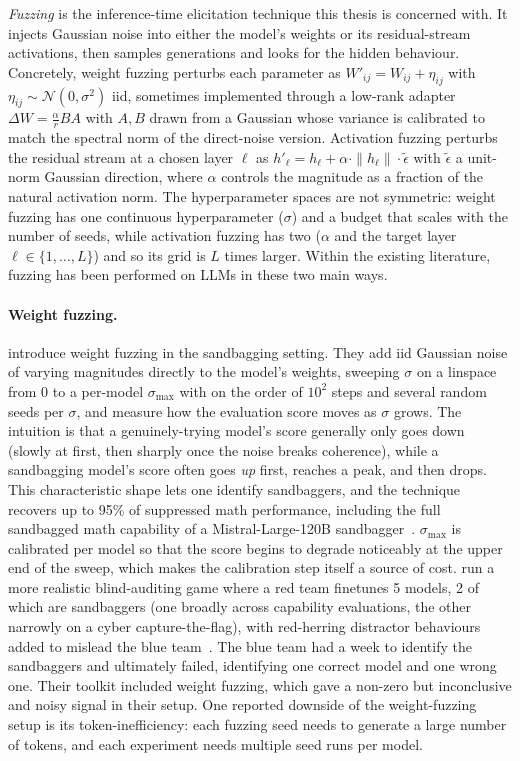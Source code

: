 \documentclass{article}
\begin{document}
\emph{Fuzzing} is the inference-time elicitation technique this thesis is concerned with. It injects Gaussian noise into either the model's weights or its residual-stream activations, then samples generations and looks for the hidden behaviour. Concretely, weight fuzzing perturbs each parameter as $W'_{ij} = W_{ij} + \eta_{ij}$ with $\eta_{ij} \sim \mathcal{N}(0, \sigma^2)$ iid, sometimes implemented through a low-rank adapter~\citep{hu2022lora} $\Delta W = \frac{\alpha}{r} B A$ with $A, B$ drawn from a Gaussian whose variance is calibrated to match the spectral norm of the direct-noise version. Activation fuzzing perturbs the residual stream at a chosen layer $\ell$ as $h'_\ell = h_\ell + \alpha \cdot \|h_\ell\| \cdot \tilde{\epsilon}$ with $\tilde{\epsilon}$ a unit-norm Gaussian direction, where $\alpha$ controls the magnitude as a fraction of the natural activation norm. The hyperparameter spaces are not symmetric: weight fuzzing has one continuous hyperparameter ($\sigma$) and a budget that scales with the number of seeds, while activation fuzzing has two ($\alpha$ and the target layer $\ell \in \{1, \ldots, L\}$) and so its grid is $L$ times larger. Within the existing literature, fuzzing has been performed on LLMs in these two main ways.


\paragraph{Weight fuzzing.} \citet{tice2024} introduce weight fuzzing in the sandbagging setting. They add iid Gaussian noise of varying magnitudes directly to the model's weights, sweeping $\sigma$ on a linspace from $0$ to a per-model $\sigma_{\max}$ with on the order of $10^2$ steps and several random seeds per $\sigma$, and measure how the evaluation score moves as $\sigma$ grows. The intuition is that a genuinely-trying model's score generally only goes down (slowly at first, then sharply once the noise breaks coherence), while a sandbagging model's score often goes \emph{up} first, reaches a peak, and then drops. This characteristic shape lets one identify sandbaggers, and the technique recovers up to 95\% of suppressed math performance, including the full sandbagged math capability of a Mistral-Large-120B sandbagger~\citep{tice2024}. $\sigma_{\max}$ is calibrated per model so that the score begins to degrade noticeably at the upper end of the sweep, which makes the calibration step itself a source of cost. \citet{ukaisi2025} run a more realistic blind-auditing game where a red team finetunes 5 models, 2 of which are sandbaggers (one broadly across capability evaluations, the other narrowly on a cyber capture-the-flag), with red-herring distractor behaviours added to mislead the blue team~\citep{ukaisi2025}. The blue team had a week to identify the sandbaggers and ultimately failed, identifying one correct model and one wrong one. Their toolkit included weight fuzzing, which gave a non-zero but inconclusive and noisy signal in their setup. One reported downside of the weight-fuzzing setup is its token-inefficiency: each fuzzing seed needs to generate a large number of tokens, and each experiment needs multiple seed runs per model.
\end{document}
